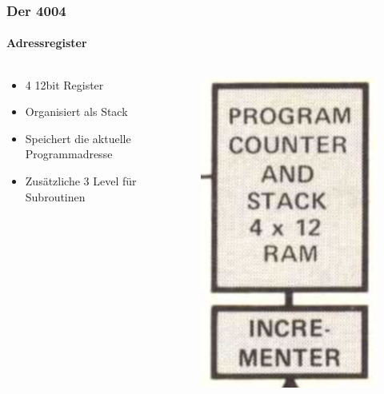 \begin{frame}
	\frametitle{Der 4004}
	\framesubtitle{Adressregister}
	\begin{columns}
		\begin{column}{.5\textwidth}
			\begin{itemize}
				\item 4 12bit Register
				\item Organisiert als Stack
				\item Speichert die aktuelle Programmadresse
				\item Zusätzliche 3 Level für Subroutinen
			\end{itemize}
		\end{column}
		\begin{column}{.5\textwidth}
			\begin{figure}[ht]
				\includegraphics[width=0.5\linewidth]{images/addr_register.png}
			\end{figure}
		\end{column}
	\end{columns}
\end{frame}


